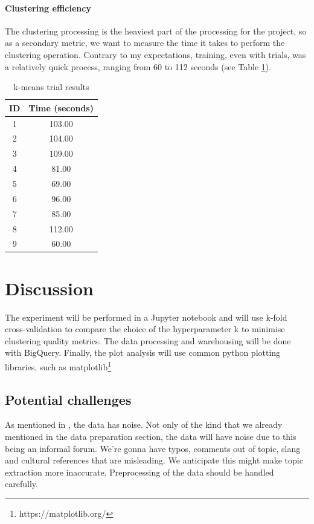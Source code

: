 \documentclass[nonacm,sigconf]{acmart}
\begin{document}
\paragraph{Clustering efficiency} The clustering processing is the heaviest part of the processing for the project, so as a secondary metric, we want to measure the time it takes to perform the clustering operation. Contrary to my expectations, training, even with trials, was a relatively quick process, ranging from 60 to 112 seconds (see Table \ref{tab:kmeanstime}).

\begin{table}[h]
  \caption{k-means trial results}
  \label{tab:kmeanstime}
  \begin{tabular}{|c|c|}
    \hline
    ID&Time (seconds)\\
    \hline
    1 & 103.00	\\
    2 & 104.00	\\
    3 & 109.00	\\
    4 & 81.00	\\
    5 & 69.00	\\
    6 & 96.00	\\
    7 & 85.00	\\
    8 & 112.00	\\
    9 & 60.00 \\
    \hline
\end{tabular}
\end{table}

\section{Discussion}

The experiment will be performed in a Jupyter notebook and will use k-fold cross-validation to compare the choice of the hyperparameter k to minimise clustering quality metrics. The data processing and warehousing will be done with BigQuery. Finally, the plot analysis will use common python plotting libraries, such as matplotlib\footnote{https://matplotlib.org/}

\subsection{Potential challenges}

As mentioned in \cite{churchill21}, the data has noise. Not only of the kind that we already mentioned in the data preparation section, the data will have noise due to this being an informal forum. We're gonna have typos, comments out of topic, slang and cultural references that are misleading. We anticipate this might make topic extraction more inaccurate. Preprocessing of the data should be handled carefully.
\end{document}
